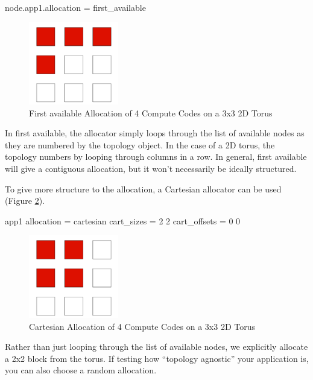 \begin{ViFile}
node.app1.allocation = first_available
\end{ViFile}
\begin{figure}[h]
\centering
\includegraphics[width=0.35\textwidth]{figures/tikz/allocation/firstavailable.png}
\caption{First available Allocation of 4 Compute Codes on a 3x3 2D Torus}
\label{fig:allocation:first_available}
\end{figure}
In first available, the allocator simply loops through the list of available nodes as they are numbered by the topology object.
In the case of a 2D torus, the topology numbers by looping through columns in a row.
In general, first available will give a contiguous allocation, but it won't necessarily be ideally structured.

To give more structure to the allocation, a Cartesian allocator can be used (Figure \ref{fig:allocation:cartesian}).

\begin{ViFile}
app1 {
 allocation = cartesian
 cart_sizes = 2 2
 cart_offsets = 0 0
}
\end{ViFile}
\begin{figure}[h]
\centering
\includegraphics[width=0.35\textwidth]{figures/tikz/allocation/cartesian.png}
\caption{Cartesian Allocation of 4 Compute Codes on a 3x3 2D Torus}
\label{fig:allocation:cartesian}
\end{figure}
Rather than just looping through the list of available nodes, we explicitly allocate a 2x2 block from the torus.
If testing how ``topology agnostic'' your application is, you can also choose a random allocation.

